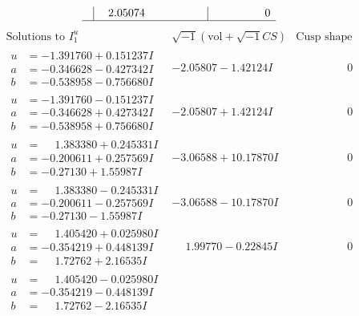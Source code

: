 \documentclass[1p]{elsarticle_modified}
\theoremstyle{definition}
\newcommand{\I}{\sqrt{-1}}
\begin{document}
$$\begin{array}{c|c|c}
 & \phantom{-}2.05074\phantom{ +0.000000I} & \phantom{-0.000000 } 0\\
 \hline 
 \end{array}$$\newpage$$\begin{array}{c|c|c}  
\text{Solutions to }I^u_{1}& \I (\text{vol} + \sqrt{-1}CS) & \text{Cusp shape}\\
 \hline 
\begin{aligned}
u &= -1.391760 + 0.151237 I \\
a &= -0.346628 - 0.427342 I \\
b &= -0.538958 - 0.756680 I\end{aligned}
 & -2.05807 - 1.42124 I & \phantom{-0.000000 } 0 \\ \hline\begin{aligned}
u &= -1.391760 - 0.151237 I \\
a &= -0.346628 + 0.427342 I \\
b &= -0.538958 + 0.756680 I\end{aligned}
 & -2.05807 + 1.42124 I & \phantom{-0.000000 } 0 \\ \hline\begin{aligned}
u &= \phantom{-}1.383380 + 0.245331 I \\
a &= -0.200611 + 0.257569 I \\
b &= -0.27130 + 1.55987 I\end{aligned}
 & -3.06588 + 10.17870 I & \phantom{-0.000000 } 0 \\ \hline\begin{aligned}
u &= \phantom{-}1.383380 - 0.245331 I \\
a &= -0.200611 - 0.257569 I \\
b &= -0.27130 - 1.55987 I\end{aligned}
 & -3.06588 - 10.17870 I & \phantom{-0.000000 } 0 \\ \hline\begin{aligned}
u &= \phantom{-}1.405420 + 0.025980 I \\
a &= -0.354219 + 0.448139 I \\
b &= \phantom{-}1.72762 + 2.16535 I\end{aligned}
 & \phantom{-}1.99770 - 0.22845 I & \phantom{-0.000000 } 0 \\ \hline\begin{aligned}
u &= \phantom{-}1.405420 - 0.025980 I \\
a &= -0.354219 - 0.448139 I \\
b &= \phantom{-}1.72762 - 2.16535 I\end{aligned}

\end{array}$$
\end{document}
